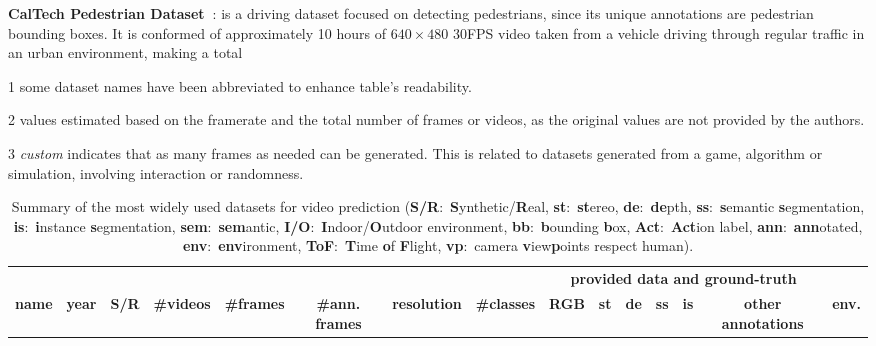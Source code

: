 \vspace*{0.1cm}\noindent\textbf{CalTech Pedestrian Dataset~\cite{Dollar2009}}: is a driving dataset focused on detecting pedestrians, since its unique annotations are pedestrian bounding boxes. It is conformed of approximately \num{10} hours of $640 \times 480$ $30$\ac{FPS} video taken from a vehicle driving through regular traffic in an urban environment, making a total

\begin{landscape}
	\scriptsize
		\begin{ThreePartTable}
			\begin{TableNotes}
				\scriptsize
				\item[1] some dataset names have been abbreviated to enhance table's readability.
				\item[2] values estimated based on the framerate and the total number of frames or videos, as the original values are not provided by the authors.
				\item[3] \textit{custom} indicates that as many frames as needed can be generated. This is related to datasets generated from a game, algorithm or simulation, involving interaction or randomness.
			\end{TableNotes}
			\setlength\LTleft{0pt}
			\setlength\LTright{0pt}
			\begin{longtable}[t]{@{\extracolsep{\fill}}lcccccccccccccc@{}}
				\caption{Summary of the most widely used datasets for video prediction (\textbf{S/R}:~\textbf{S}ynthetic/\textbf{R}eal, \textbf{st}:~\textbf{st}ereo, \textbf{de}:~\textbf{de}pth,
					\textbf{ss}:~\textbf{s}emantic \textbf{s}egmentation, \textbf{is}:~\textbf{i}nstance \textbf{s}egmentation, \textbf{sem}:~\textbf{sem}antic, \textbf{I/O}:~\textbf{I}ndoor/\textbf{O}utdoor environment, \textbf{bb}:~\textbf{b}ounding \textbf{b}ox, \textbf{Act}:~\textbf{Act}ion label, \textbf{ann}:~\textbf{ann}otated, \textbf{env}:~\textbf{env}ironment, \textbf{ToF}:~\textbf{T}ime \textbf{o}f \textbf{F}light, \textbf{vp}:~camera \textbf{v}iew\textbf{p}oints respect human).} \\
				\toprule
				& & & & & & & & \multicolumn{6}{c}{\textbf{provided data and ground-truth}} & \\
				\cmidrule(lr){9-14}
				\textbf{name}\tnote{1} & \textbf{year} & \textbf{S/R} & \textbf{\#videos} & \textbf{\#frames} & \textbf{\#ann. frames} & \textbf{resolution} & \textbf{\#classes} & \textbf{RGB} & \textbf{st} & \textbf{de} & \textbf{ss} & \textbf{is} & \textbf{other annotations} & \textbf{env.}\\

\end{longtable}
\end{ThreePartTable}
\end{landscape}
